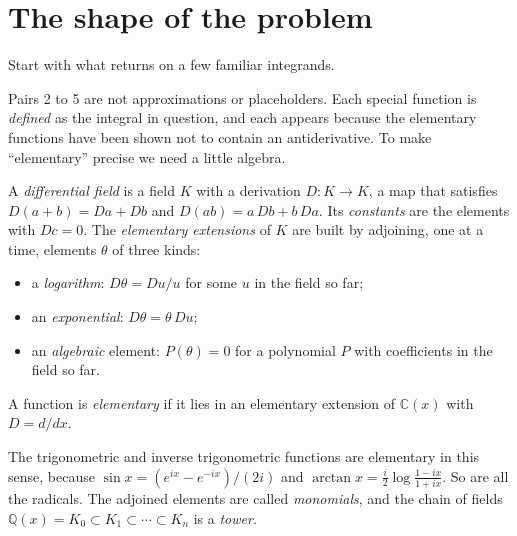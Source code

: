 \section{The shape of the problem}
\label{sec:int-shape}

Start with what  returns on a few familiar integrands.

\begin{codepairs}
\end{codepairs}

Pairs 2 to 5 are not approximations or placeholders. Each special function is
\emph{defined} as the integral in question, and each appears because the
elementary functions have been shown not to contain an antiderivative. To make
``elementary'' precise we need a little algebra.

\begin{definition}
A \emph{differential field} is a field \(K\) with a
derivation \(D\colon K\to K\), a map that satisfies \(D(a+b)=Da+Db\) and
\(D(ab)=a\,Db+b\,Da\). Its \emph{constants} are the elements with \(Dc=0\). The
\emph{elementary extensions} of \(K\) are built by
adjoining, one at a time, elements \(\theta\) of three kinds:
\begin{itemize}
\item a \emph{logarithm}: \(D\theta = Du/u\) for some \(u\) in the field so far;
\item an \emph{exponential}: \(D\theta = \theta\,Du\);
\item an \emph{algebraic} element: \(P(\theta)=0\) for a polynomial \(P\) with
coefficients in the field so far.
\end{itemize}
A function is \emph{elementary} if it lies in an elementary extension of
\(\mathbb{C}(x)\) with \(D=d/dx\).
\end{definition}

The trigonometric and inverse trigonometric functions are elementary in this
sense, because \(\sin x = (e^{ix}-e^{-ix})/(2i)\) and \(\arctan x =
\tfrac{i}{2}\log\frac{1-ix}{1+ix}\). So are all the radicals. The adjoined
elements are called \emph{monomials}, and
the chain of fields \(\mathbb{Q}(x)=K_0\subset K_1\subset\cdots\subset K_n\) is a
\emph{tower}.

